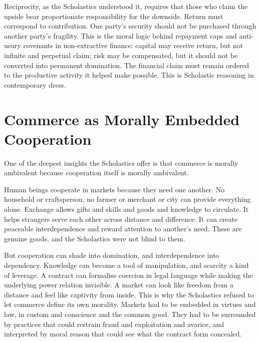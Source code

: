 \documentclass[11pt,a4paper,oneside]{book}
\begin{document}
Reciprocity, as the Scholastics understood it, requires that those who claim the upside bear proportionate responsibility for the downside. Return must correspond to contribution. One party's security should not be purchased through another party's fragility. This is the moral logic behind repayment caps and anti-usury covenants in non-extractive finance: capital may receive return, but not infinite and perpetual claim; risk may be compensated, but it should not be converted into permanent domination. The financial claim must remain ordered to the productive activity it helped make possible. This is Scholastic reasoning in contemporary dress.

\section*{Commerce as Morally Embedded Cooperation}

One of the deepest insights the Scholastics offer is that commerce is morally ambivalent because cooperation itself is morally ambivalent.

Human beings cooperate in markets because they need one another. No household or craftsperson, no farmer or merchant or city can provide everything alone. Exchange allows gifts and skills and goods and knowledge to circulate. It helps strangers serve each other across distance and difference. It can create peaceable interdependence and reward attention to another's need. These are genuine goods, and the Scholastics were not blind to them.

But cooperation can shade into domination, and interdependence into dependency. Knowledge can become a tool of manipulation, and scarcity a kind of leverage. A contract can formalise coercion in legal language while making the underlying power relation invisible. A market can look like freedom from a distance and feel like captivity from inside. This is why the Scholastics refused to let commerce define its own morality. Markets had to be embedded in virtues and law, in custom and conscience and the common good. They had to be surrounded by practices that could restrain fraud and exploitation and avarice, and interpreted by moral reason that could see what the contract form concealed.
\end{document}
